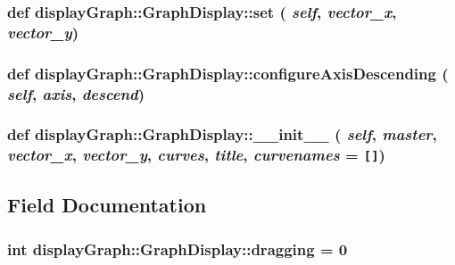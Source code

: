 \hypertarget{classdisplayGraph_1_1GraphDisplay_a7a5a3b2c43eb0eb3b3b3d5fb849f3f7}{
\subsubsection{\setlength{\rightskip}{0pt plus 5cm}def displayGraph::GraphDisplay::set ( {\em self}, \/   {\em vector\_\-x}, \/   {\em vector\_\-y})}}
\label{classdisplayGraph_1_1GraphDisplay_a7a5a3b2c43eb0eb3b3b3d5fb849f3f7}


\hypertarget{classdisplayGraph_1_1GraphDisplay_bea02a676e7e7bd8da55c67331af5f73}{
\subsubsection{\setlength{\rightskip}{0pt plus 5cm}def displayGraph::GraphDisplay::configureAxisDescending ( {\em self}, \/   {\em axis}, \/   {\em descend})}}
\label{classdisplayGraph_1_1GraphDisplay_bea02a676e7e7bd8da55c67331af5f73}


\hypertarget{classdisplayGraph_1_1GraphDisplay_ea27023f29764cb14e3cfdecd7ea6faa}{
\subsubsection{\setlength{\rightskip}{0pt plus 5cm}def displayGraph::GraphDisplay::\_\-\_\-init\_\-\_\- ( {\em self}, \/   {\em master}, \/   {\em vector\_\-x}, \/   {\em vector\_\-y}, \/   {\em curves}, \/   {\em title}, \/   {\em curvenames} = {\tt \mbox{[}\mbox{]}})}}
\label{classdisplayGraph_1_1GraphDisplay_ea27023f29764cb14e3cfdecd7ea6faa}




\subsection{Field Documentation}
\hypertarget{classdisplayGraph_1_1GraphDisplay_94f44c31c345d1e6cc7bf065eadc0930}{
\subsubsection{\setlength{\rightskip}{0pt plus 5cm}int {\bf displayGraph::GraphDisplay::dragging} = 0}}
\label{classdisplayGraph_1_1GraphDisplay_94f44c31c345d1e6cc7bf065eadc0930}


